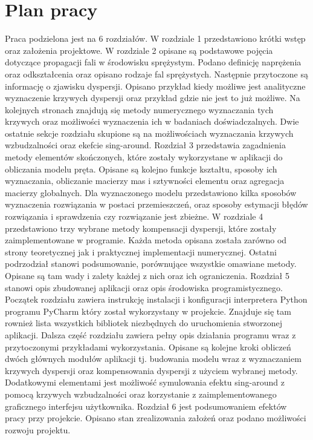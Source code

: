 \section{Plan pracy}
\label{sec:plan_pracy}

Praca podzielona jest na 6 rozdziałów. W rozdziale 1 przedstawiono krótki wstęp oraz założenia projektowe. W rozdziale 2 opisane są podstawowe pojęcia dotyczące propagacji fali w środowisku sprężystym. Podano definicję naprężenia oraz odkształcenia oraz opisano rodzaje fal sprężystych. Następnie przytoczone są informację o zjawisku dyspersji. Opisano przykład kiedy możliwe jest analityczne wyznaczenie krzywych dyspersji oraz przykład gdzie nie jest to już możliwe. Na kolejnych stronach znajdują się metody numerycznego wyznaczania tych krzywych oraz możliwości wyznaczenia ich w badaniach doświadczalnych. Dwie ostatnie sekcje rozdziału skupione są na możliwościach wyznaczania krzywych wzbudzalności oraz ekefcie sing-around. Rozdział 3 przedstawia zagadnienia metody elementów skończonych, które zostały wykorzystane w aplikacji do obliczania modelu pręta. Opisane są kolejno funkcje kształtu, sposoby ich wyznaczania, obliczanie macierzy mas i sztywności elementu oraz agregacja macierzy globalnych. Dla wyznaczonego modelu przedstawiono kilka sposobów wyznaczenia rozwiązania w postaci przemieszczeń, oraz sposoby estymacji błędów rozwiązania i sprawdzenia czy rozwiązanie jest zbieżne. W rozdziale 4 przedstawiono trzy wybrane metody kompensacji dyspersji, które zostały zaimplementowane w programie. Każda metoda opisana została zarówno od strony teoretycznej jak i praktycznej implementacji numerycznej. Ostatni podrzodział stanowi podsumowanie, porównujące wszystkie omawiane metody. Opisane są tam wady i zalety każdej z nich oraz ich ograniczenia. Rozdział 5 stanowi opis zbudowanej aplikacji oraz opis środowiska programistycznego. Początek rozdziału zawiera instrukcję instalacji i konfiguracji interpretera Python programu PyCharm  który został wykorzystany w projekcie. Znajduje się tam rownież lista wszystkich bibliotek niezbędnych do uruchomienia stworzonej aplikacji. Dalsza część rozdziału zawiera pełny opis działania programu wraz z przytoczonymi przykładami wykorzystania. Opisane są kolejne kroki obliczeń dwóch głównych modułów aplikacji tj. budowania modelu wraz z wyznaczaniem krzywych dyspersji oraz kompensowania dyspersji z użyciem wybranej metody. Dodatkowymi elementami jest możliwość symulowania efektu sing-around z pomocą krzywych wzbudzalności oraz korzystanie z zaimplementowanego graficznego interfejsu użytkownika. Rozdział 6 jest podsumowaniem efektów pracy przy projekcie. Opisano stan zrealizowania założeń oraz podano możliwości rozwoju projektu.




















